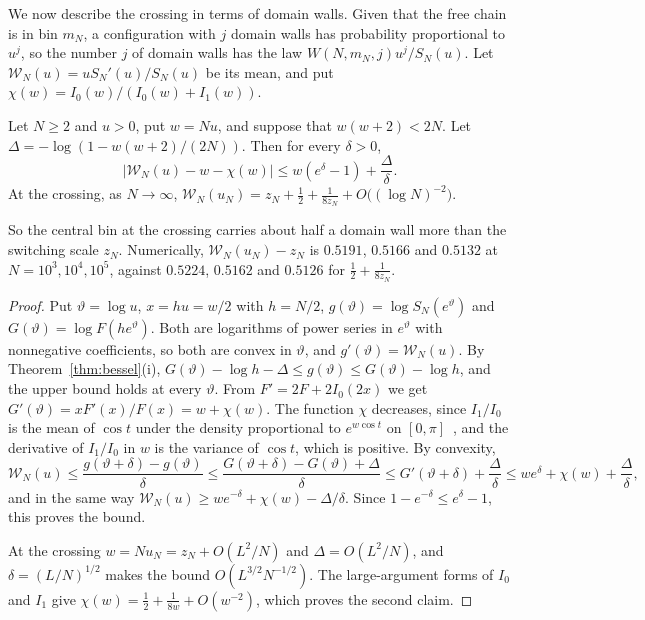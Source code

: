 We now describe the crossing in terms of domain walls. Given that
the free chain is in bin $m_N$, a configuration with $j$ domain walls has probability proportional to
$u^{j}$, so the number $j$ of domain walls has the law $W(N,m_N,j)u^j/S_N(u)$. Let $\mathcal W_N(u)=uS_N'(u)/S_N(u)$ be its mean, and put
$\chi(w)=I_0(w)/(I_0(w)+I_1(w))$.

\begin{proposition}\label{prop:walls}
Let $N\ge2$ and $u>0$, put $w=Nu$, and suppose that $w(w+2)<2N$. Let
$\Delta=-\log(1-w(w+2)/(2N))$. Then for every $\delta>0$,
\[
\bigl|\mathcal W_N(u)-w-\chi(w)\bigr|\le w(e^\delta-1)+\frac\Delta\delta .
\]
At the crossing, as $N\to\infty$,
$\mathcal W_N(u_N)=z_N+\frac12+\frac1{8z_N}+O\bigl((\log N)^{-2}\bigr)$.
\end{proposition}

So the central bin at the crossing carries about half a domain wall more
than the switching scale $z_N$. Numerically, $\mathcal W_N(u_N)-z_N$ is $0.5191$,
$0.5166$ and $0.5132$ at $N=10^3,10^4,10^5$, against $0.5224$, $0.5162$ and
$0.5126$ for $\frac12+\frac1{8z_N}$.

\begin{proof}
Put $\vartheta=\log u$, $x=hu=w/2$ with $h=N/2$, $g(\vartheta)=\log S_N(e^\vartheta)$ and
$G(\vartheta)=\log F(he^\vartheta)$. Both are logarithms of power series in $e^\vartheta$ with
nonnegative coefficients, so both are convex in $\vartheta$, and $g'(\vartheta)=\mathcal W_N(u)$.
By Theorem~\ref{thm:bessel}(i), $G(\vartheta)-\log h-\Delta\le g(\vartheta)\le G(\vartheta)-\log h$,
and the upper bound holds at every $\vartheta$. From $F'=2F+2I_0(2x)$ we get
$G'(\vartheta)=xF'(x)/F(x)=w+\chi(w)$. The function $\chi$ decreases, since
$I_1/I_0$ is the mean of $\cos t$ under the density proportional to
$e^{w\cos t}$ on $[0,\pi]$~\cite[Eq.~10.32.3]{dlmf}, and the derivative of $I_1/I_0$ in $w$
is the variance of $\cos t$, which is positive. By convexity,
\[
\mathcal W_N(u)\le\frac{g(\vartheta+\delta)-g(\vartheta)}\delta
\le\frac{G(\vartheta+\delta)-G(\vartheta)+\Delta}\delta\le G'(\vartheta+\delta)+\frac\Delta\delta
\le we^\delta+\chi(w)+\frac\Delta\delta,
\]
and in the same way $\mathcal W_N(u)\ge we^{-\delta}+\chi(w)-\Delta/\delta$.
Since $1-e^{-\delta}\le e^\delta-1$, this proves the bound.

At the crossing $w=Nu_N=z_N+O(L^2/N)$ and $\Delta=O(L^2/N)$, and
$\delta=(L/N)^{1/2}$ makes the bound $O(L^{3/2}N^{-1/2})$. The large-argument
forms of $I_0$ and $I_1$ give $\chi(w)=\frac12+\frac1{8w}+O(w^{-2})$, which
proves the second claim.
\end{proof}

